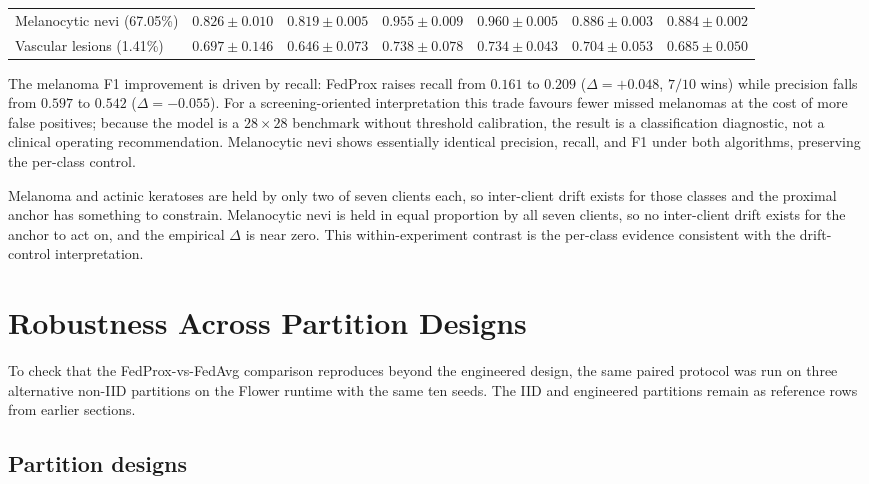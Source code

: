 \documentclass[11pt,a4paper]{report}
\begin{document}
\begin{table}[!htbp]
{\begin{tabular}{@{}l cc cc cc@{}}
Melanocytic nevi (67.05\%)    & $0.826 \pm 0.010$          & $0.819 \pm 0.005$            & $0.955 \pm 0.009$          & $0.960 \pm 0.005$            & $0.886 \pm 0.003$          & $0.884 \pm 0.002$            \\
Vascular lesions (1.41\%)     & $0.697 \pm 0.146$          & $0.646 \pm 0.073$            & $0.738 \pm 0.078$          & $0.734 \pm 0.043$            & $0.704 \pm 0.053$          & $0.685 \pm 0.050$            \\
\bottomrule
\end{tabular}%
}
\end{table}

The melanoma F1 improvement is driven by recall: FedProx raises
recall from $0.161$ to $0.209$ ($\Delta = +0.048$, $7/10$ wins)
while precision falls from $0.597$ to $0.542$ ($\Delta = -0.055$).
For a screening-oriented interpretation this trade favours fewer
missed melanomas at the cost of more false positives; because the
model is a $28 \times 28$ benchmark without threshold calibration,
the result is a classification diagnostic, not a clinical
operating recommendation. Melanocytic nevi shows essentially
identical precision, recall, and F1 under both algorithms,
preserving the per-class control.

Melanoma and actinic keratoses are held by only two of seven
clients each, so inter-client drift exists for those classes and
the proximal anchor has something to constrain. Melanocytic nevi
is held in equal proportion by all seven clients, so no
inter-client drift exists for the anchor to act on, and the
empirical $\Delta$ is near zero. This within-experiment contrast
is the per-class evidence consistent with the drift-control
interpretation.

\section{Robustness Across Partition Designs}
\label{sec:partition-robustness}

To check that the FedProx-vs-FedAvg comparison reproduces beyond
the engineered design, the same paired protocol was run on three
alternative non-IID partitions on the Flower runtime with the
same ten seeds. The IID and engineered partitions remain as
reference rows from earlier sections.

\subsection{Partition designs}
\label{sec:partition-designs}
\end{document}

